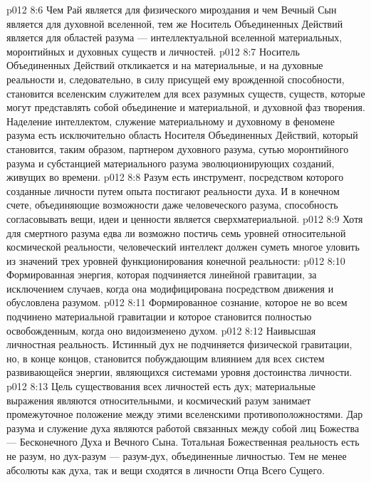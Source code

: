 \vs p012 8:6 \pc Чем Рай является для физического мироздания и чем Вечный Сын является для духовной вселенной, тем же Носитель Объединенных Действий является для областей разума --- интеллектуальной вселенной материальных, моронтийных и духовных существ и личностей.
\vs p012 8:7 Носитель Объединенных Действий откликается и на материальные, и на духовные реальности и, следовательно, в силу присущей ему врожденной способности, становится вселенским служителем для всех разумных существ, существ, которые могут представлять собой объединение и материальной, и духовной фаз творения. Наделение интеллектом, служение материальному и духовному в феномене разума есть исключительно область Носителя Объединенных Действий, который становится, таким образом, партнером духовного разума, сутью моронтийного разума и субстанцией материального разума эволюционирующих созданий, живущих во времени.
\vs p012 8:8 Разум есть инструмент, посредством которого созданные личности путем опыта постигают реальности духа. И в конечном счете, объединяющие возможности даже человеческого разума, способность согласовывать вещи, идеи и ценности является сверхматериальной.
\vs p012 8:9 \pc Хотя для смертного разума едва ли возможно постичь семь уровней относительной космической реальности, человеческий интеллект должен суметь многое уловить из значений трех уровней функционирования конечной реальности:
\vs p012 8:10 \bibnobreakspace {} Формированная энергия, которая подчиняется линейной гравитации, за исключением случаев, когда она модифицирована посредством движения и обусловлена разумом.
\vs p012 8:11 \bibnobreakspace {} Формированное сознание, которое не во всем подчинено материальной гравитации и которое становится полностью освобожденным, когда оно видоизменено духом.
\vs p012 8:12 \bibnobreakspace {} Наивысшая личностная реальность. Истинный дух не подчиняется физической гравитации, но, в конце концов, становится побуждающим влиянием для всех систем развивающейся энергии, являющихся системами уровня достоинства личности.
\vs p012 8:13 \pc Цель существования всех личностей есть дух; материальные выражения являются относительными, и космический разум занимает промежуточное положение между этими вселенскими противоположностями. Дар разума и служение духа являются работой связанных между собой лиц Божества --- Бесконечного Духа и Вечного Сына. Тотальная Божественная реальность есть не разум, но дух\hyp{}разум --- разум\hyp{}дух, объединенные личностью. Тем не менее абсолюты как духа, так и вещи сходятся в личности Отца Всего Сущего.
